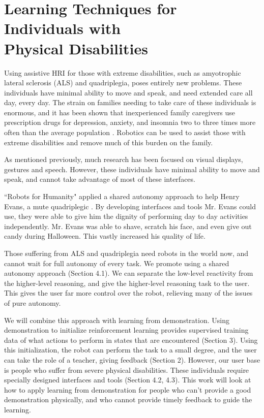 \documentclass{article}
\begin{document}

\section{Learning Techniques for Individuals with \\ Physical Disabilities}

Using assistive HRI for those with extreme disabilities, such as amyotrophic lateral sclerosis (ALS) and quadriplegia, poses entirely new  problems. These individuals have minimal ability to move and speak, and need extended care all day, every day. The strain on families needing to take care of these individuals is enormous, and it has been shown that inexperienced family caregivers use prescription drugs for depression, anxiety, and insomnia two to three times more often than the average population \cite{Gallagher01081989}. Robotics can be used to assist those with extreme disabilities and remove much of this burden on the family. 

As mentioned previously, much research has been focused on visual displays, gestures and speech. However, these individuals have minimal ability to move and speak, and cannot take advantage of most of these interfaces. 

``Robots for Humanity" applied a shared autonomy approach to help Henry Evans, a mute quadriplegic \cite{journals/ram/ChenCCGHHKKLLNPPST13}. By developing interfaces and tools Mr. Evans could use, they were able to give him the dignity of performing day to day activities independently. Mr. Evans was able to shave, scratch his face, and even give out candy during Halloween. This vastly increased his quality of life.

Those suffering from ALS and quadriplegia need robots in the world now, and cannot wait for full autonomy of every task. We promote using a shared autonomy approach (Section 4.1). We can separate the low-level reactivity from the higher-level reasoning, and give the higher-level reasoning task to the user. This gives the user far more control over the robot, relieving many of the issues of pure autonomy.

We will combine this approach with learning from demonstration. Using demonstration to initialize reinforcement learning provides supervised training data of what actions to perform in states that are encountered (Section 3). Using this initialization, the robot can perform the task to a small degree, and the user can take the role of a teacher, giving feedback (Section 2). However, our user base is people who suffer from severe physical disabilities. These individuals require specially designed interfaces and tools (Section 4.2, 4.3). This work will look at how to apply learning from demonstration for people who can't provide a good demonstration physically, and who cannot provide timely feedback to guide the learning.
\end{document}
